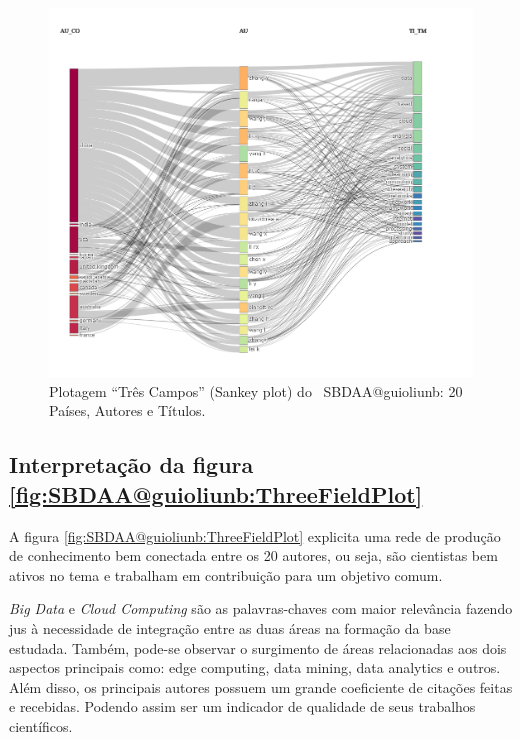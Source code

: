 \begin{figure}
    \centering
    \includegraphics[angle=0,width=1\textwidth]{experiments/guioliunb/AnaliseBibliometrica/SocialBigDataAnalysis/3FSE-countriesXauthorsXtitles.png}
    \caption{Plotagem ``Três Campos'' (Sankey plot) do \dataset\   SBDAA@guioliunb: 20 Países, Autores e Títulos.}
    \label{fig:SBDAA@guioliunb:ThreeFieldPlot2}
\end{figure}

\subsection{Interpretação da figura \ref{fig:SBDAA@guioliunb:ThreeFieldPlot}}



A figura \ref{fig:SBDAA@guioliunb:ThreeFieldPlot} explicita uma rede de produção de conhecimento bem conectada entre os 20 autores, ou seja, são cientistas bem ativos no tema e trabalham em contribuição para um objetivo comum.

\textit{Big Data} e \textit{Cloud Computing} são as palavras-chaves com maior relevância fazendo jus à necessidade de integração entre as duas áreas na formação da base estudada.
Também, pode-se observar o surgimento de áreas relacionadas aos dois aspectos principais como: edge computing, data mining, data analytics e outros.
Além disso, os principais autores possuem um grande coeficiente de citações feitas e recebidas. Podendo assim ser um indicador de qualidade de seus trabalhos científicos.

